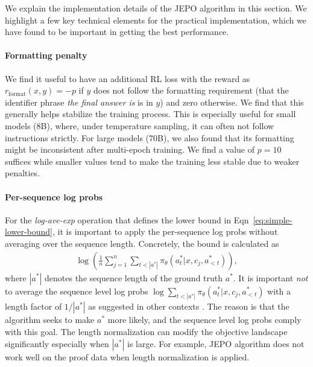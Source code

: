 \documentclass{article}
\theoremstyle{definition}
\begin{document}
We explain the implementation details of the JEPO algorithm in this section. We highlight a few key technical elements for the practical implementation, which we have found to be important in getting the best performance.

\paragraph{Formatting penalty}
We find it useful to have an additional RL loss with the reward as $r_\text{format}(x,y)=-p$ if $y$ does not follow the formatting requirement (that the identifier phrase \emph{the final answer is} is in $y$) and zero otherwise. We find that this generally helps stabilize the training process. This is especially useful for small models (8B), where, under temperature sampling, it can often not follow instructions strictly. For large models (70B), we also found that its formatting might be inconsistent after multi-epoch training. We find a value of $p=10$ suffices while smaller values tend to make the training less stable due to weaker penalties.

\paragraph{Per-sequence log probs} For the \emph{log-ave-exp} operation that defines the lower bound in Eqn~\eqref{eq:simple-lower-bound}, it is important to apply the per-sequence log probs without averaging over the sequence length. Concretely, the bound is calculated as
\begin{align*}
     \log \left(\frac{1}{n}\sum_{j=1}^n \sum_{t< |a^\ast|} \pi_\theta(a_t^\ast|x,c_j,a_{<t}^\ast)\right),
\end{align*}
where $|a^*|$ denotes the sequence length of the ground truth $a^*$. It is important \emph{not} to average the sequence level log probs $\log \sum_{t< |a^\ast|} \pi_\theta(a_t^\ast|x,c_j,a_{<t}^\ast)$ with a length factor of $1/|a^\ast|$ as suggested in other contexts \citep{grinsztajn2024averaging,shao2024deepseekmath}. The reason is that the algorithm seeks to make $a^*$ more likely, and the sequence level log probs comply with this goal. The length normalization can modify the objective landscape significantly especially when $|a^*|$ is large. For example, JEPO algorithm does not work well on the proof data when length normalization is applied.
\end{document}
